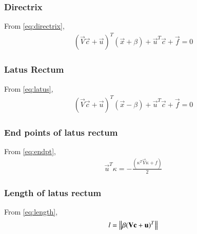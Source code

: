 \documentclass[journal,12pt,twocolumn]{IEEEtran}
\begin{document}
\subsubsection{Directrix}
From \eqref{eq:directrix},
\begin{align}
    (\vec{V}\vec{c}+\vec{u})^T(\vec{x} +\beta) + \vec{u}^T\vec{c} + \vec{f} = 0
\end{align}
\subsubsection{Latus Rectum}
From \eqref{eq:latus},
\begin{align}
    (\vec{V}\vec{c}+\vec{u})^T(\vec{x} -\beta) + \vec{u}^T\vec{c} + \vec{f} = 0
\end{align}
\subsubsection{End points of latus rectum}
From \eqref{eq:endpt},
\begin{align}
    \vec{u}^T\kappa = -\frac{(\kappa^T\vec{V}\kappa + f )}{2}
\end{align}
\subsubsection{Length of latus rectum}
From \eqref{eq:length},
\begin{align}
   l=\left\lVert\beta(\mathbf{V}\mathbf{c}+\mathbf{u})^T\right\rVert 
\end{align}
\end{document}
